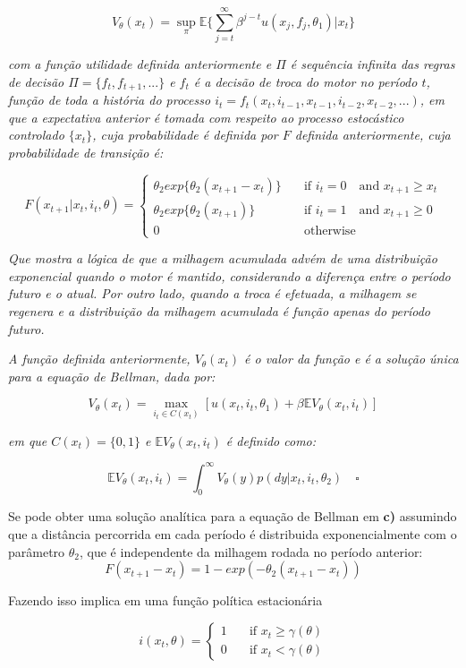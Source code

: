 \documentclass[12pt,a4paper]{article}
\begin{document}
\[
V_\theta(x_t)=\sup_\pi \mathbb{E}\Bigg\{\sum_{j=t}^\infty \beta^{j-t}u(x_j,f_j,\theta_1)|x_t\Bigg\} 
\]

\emph{com a função utilidade definida anteriormente e \(\Pi\) é
sequência infinita das regras de decisão \(\Pi=\{f_t,f_{t+1},...\}\) e
\(f_t\) é a decisão de troca do motor no período \(t\), função de toda a
história do processo
\(i_t=f_t(x_t,i_{t-1},x_{t-1},i_{t-2},x_{t-2},...)\), em que a
expectativa anterior é tomada com respeito ao processo estocástico
controlado \(\{x_t\}\), cuja probabilidade é definida por \(F\) definida
anteriormente, cuja probabilidade de transição é:}

\[
F(x_{t+1}| x_t, i_t, \theta) = 
  \begin{cases}
    \theta_2exp\{\theta_2(x_{t+1}-x_t)\}    & \quad \text{if } i_t=0  \quad \text{and } x_{t+1} \geq x_t \\
    \theta_2exp\{\theta_2(x_{t+1})\}    & \quad \text{if } i_t=1  \quad \text{and } x_{t+1} \geq 0 \\
     0 &  \quad \text{otherwise}
  \end{cases}
\]

\emph{Que mostra a lógica de que a milhagem acumulada advém de uma
distribuição exponencial quando o motor é mantido, considerando a
diferença entre o período futuro e o atual. Por outro lado, quando a
troca é efetuada, a milhagem se regenera e a distribuição da milhagem
acumulada é função apenas do período futuro.}

\emph{A função definida anteriormente, \(V_\theta(x_t)\) é o valor da
função e é a solução única para a equação de Bellman, dada por:}

\[
V_\theta(x_t) = \max_{i_t \in C(x_t)}[u(x_t,i_t,\theta_1)+\beta\mathbb{E}V_\theta(x_t,i_t)]
\]

\emph{em que \(C(x_t)=\{0,1\}\) e \(\mathbb{E}V_\theta(x_t,i_t)\) é
definido como:}

\[
\mathbb{E}V_\theta(x_t,i_t)=\int_0^\infty V_\theta(y)p(dy|x_t,i_t,\theta_2) \quad \square
\]

Se pode obter uma solução analítica para a equação de Bellman em
\textbf{c)} assumindo que a distância percorrida em cada período é
distribuida exponencialmente com o parâmetro \(\theta_2\), que é
independente da milhagem rodada no período anterior: \[
F(x_{t+1} - x_t) = 1 - exp(-\theta_2(x_{t+1} - x_t))
\]

Fazendo isso implica em uma função política estacionária

\[ i(x_t,\theta) = 
  \begin{cases}
    1    & \quad \text{if } x_t \ge \gamma(\theta) \\
    0    & \quad \text{if } x_t < \gamma(\theta)
  \end{cases}
\]
\end{document}
